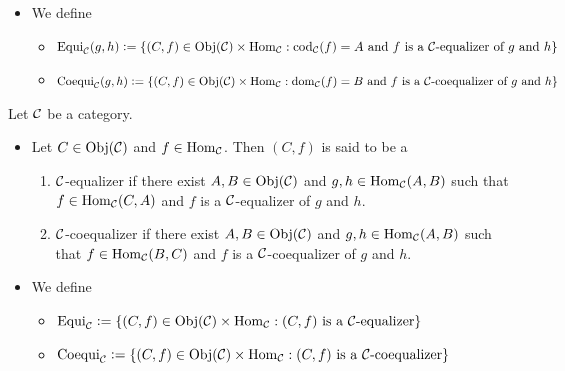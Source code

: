 \documentclass{book}
\begin{document}
\begin{defn}
\begin{itemize}
\begin{itemize}
\begin{enumerate}
\[					\]
					\item for each $C' \in \Obj(\MC)$ and $f' \in \Hom_{\MC}(B, C')$, if $ f' \circ_{\MC} g = f' \circ_{\MC} h$, then there exists a unique $\phi \in \Hom_{\MC}(C, C')$ such that $\phi \circ_{\MC} f = f'$, i.e. the following diagram commutes:
					\[ 
					\begin{tikzcd}[baseline= 7]
						A \arrow[dr, "g"]  &                   & C \arrow[dd, "\phi", dashed]\\
						& B \arrow[ur, "f"]  \arrow[dr, "f'"'] &   \\
						A \arrow[ur, "h"']  &                  & C' \\
					\end{tikzcd}
					\]
				\end{enumerate} 
			\end{itemize}
			\item We define 
			\begin{itemize}
				\item $\operatorname{Equi}_{\mathcal{C}}(g,h) \vcentcolon= \{(C, f) \in \operatorname{Obj}(\mathcal{C}) \times \operatorname{Hom}_{\mathcal{C}}: \text{$\operatorname{cod}_{\mathcal{C}}(f) = A$ and $f$ is a $\mathcal{C}$-equalizer of $g$ and $h$}\}$
				\item $\operatorname{Coequi}_{\mathcal{C}}(g,h) \vcentcolon= \{(C, f) \in \operatorname{Obj}(\mathcal{C}) \times \operatorname{Hom}_{\mathcal{C}}: \text{$\operatorname{dom}_{\mathcal{C}}(f) = B$ and $f$ is a $\mathcal{C}$-coequalizer of $g$ and $h$}\}$
			\end{itemize}
		\end{itemize}
	\end{defn}
	
	\begin{defn}
		Let $\mathcal{C}$ be a category. 
		\begin{itemize}
			\item Let $C \in \operatorname{Obj}(\mathcal{C})$ and $f \in \operatorname{Hom}_{\mathcal{C}}$. Then $(C, f)$ is said to be a
			\begin{enumerate}
				\item $\mathcal{C}$-equalizer if there exist $A,B \in \operatorname{Obj}(\mathcal{C})$ and $g,h \in \operatorname{Hom}_{\mathcal{C}}(A,B)$ such that $f \in \operatorname{Hom}_{\mathcal{C}}(C, A)$ and $f$ is a $\mathcal{C}$-equalizer of $g$ and $h$. 
				\item $\mathcal{C}$-coequalizer if there exist $A,B \in \operatorname{Obj}(\mathcal{C})$ and $g,h \in \operatorname{Hom}_{\mathcal{C}}(A,B)$ such that $f \in \operatorname{Hom}_{\mathcal{C}}(B, C)$ and $f$ is a $\mathcal{C}$-coequalizer of $g$ and $h$. 
			\end{enumerate}
			\item We define 
			\begin{itemize}
				\item $\operatorname{Equi}_{\mathcal{C}} \vcentcolon= \{(C,f) \in \operatorname{Obj}(\mathcal{C}) \times \operatorname{Hom}_{\mathcal{C}}: \text{$(C,f)$ is a $\mathcal{C}$-equalizer}\}$
				\item $\operatorname{Coequi}_{\mathcal{C}} \vcentcolon= \{(C,f) \in \operatorname{Obj}(\mathcal{C}) \times \operatorname{Hom}_{\mathcal{C}}: \text{$(C,f)$ is a $\mathcal{C}$-coequalizer}\}$
			\end{itemize}
		\end{itemize}
	\end{defn}
	
\end{document}
